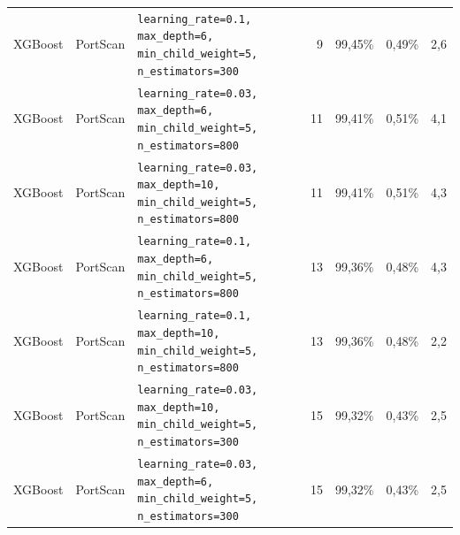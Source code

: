 {{\begin{tabularx}{\textwidth}{@{}llLrrrr@{}}
XGBoost & PortScan & \scriptsize\texttt{learning\_rate=0.1, max\_depth=6, min\_child\_weight=5, n\_estimators=300} & 9 & 99,45\% & 0,49\% & 2,6\\
XGBoost & PortScan & \scriptsize\texttt{learning\_rate=0.03, max\_depth=6, min\_child\_weight=5, n\_estimators=800} & 11 & 99,41\% & 0,51\% & 4,1\\
XGBoost & PortScan & \scriptsize\texttt{learning\_rate=0.03, max\_depth=10, min\_child\_weight=5, n\_estimators=800} & 11 & 99,41\% & 0,51\% & 4,3\\
XGBoost & PortScan & \scriptsize\texttt{learning\_rate=0.1, max\_depth=6, min\_child\_weight=5, n\_estimators=800} & 13 & 99,36\% & 0,48\% & 4,3\\
XGBoost & PortScan & \scriptsize\texttt{learning\_rate=0.1, max\_depth=10, min\_child\_weight=5, n\_estimators=800} & 13 & 99,36\% & 0,48\% & 2,2\\
XGBoost & PortScan & \scriptsize\texttt{learning\_rate=0.03, max\_depth=10, min\_child\_weight=5, n\_estimators=300} & 15 & 99,32\% & 0,43\% & 2,5\\
XGBoost & PortScan & \scriptsize\texttt{learning\_rate=0.03, max\_depth=6, min\_child\_weight=5, n\_estimators=300} & 15 & 99,32\% & 0,43\% & 2,5\\
\bottomrule
\end{tabularx}}%
}
